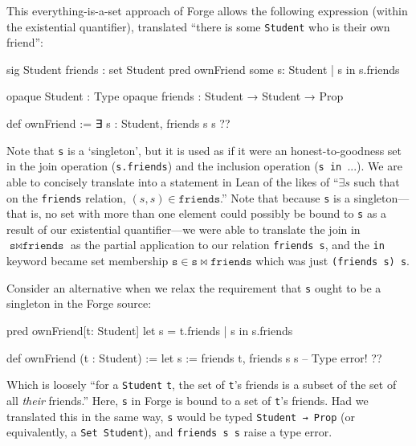 This everything-is-a-set approach of Forge allows the following expression (within the existential quantifier), translated ``there is some \texttt{Student} who is their own friend'': 

\vspace{0.5em}
\noindent\begin{minipage}{0.5\textwidth}
\begin{forge*}
sig Student {
  friends : set Student
}
pred ownFriend {
  some s: Student |
    s in s.friends
}
\end{forge*}
\end{minipage}%
\begin{minipage}{0.5\textwidth}
\begin{lean*}
opaque Student : Type
opaque friends : Student → Student → Prop

def ownFriend := 
  ∃ s : Student, 
    friends s s
?\phantom{}?
\end{lean*}
\end{minipage}
\vspace{0.5em}\newline
Note that \texttt{s} is a `singleton', but it is used as if it were an honest-to-goodness set in the join operation (\texttt{s.friends}) and the inclusion operation (\texttt{s in }...). We are able to concisely translate into a statement in Lean of the likes of ``$\exists s$ such that on the \texttt{friends} relation, $(s,s)\in \texttt{friends}$.'' Note that because \texttt{s} is a singleton---that is, no set with more than one element could possibly be bound to \texttt{s} as a result of our existential quantifier---we were able to translate the join in $\texttt{s} \bowtie \texttt{friends}$ as the partial application to our relation \texttt{friends s}, and the \texttt{in} keyword became set membership $\texttt{s}\in \texttt{s} \bowtie \texttt{friends}$ which was just \texttt{(friends s) s}. 

Consider an alternative when we relax the requirement that \texttt{s} ought to be a singleton in the Forge source: 

\vspace{0.5em}
\noindent\begin{minipage}{0.5\textwidth}
\begin{forge*}
pred ownFriend[t: Student] {
  let s = t.friends |
    s in s.friends
}
\end{forge*}
\end{minipage}%
\begin{minipage}{0.5\textwidth}
\begin{lean*}
def ownFriend (t : Student) := 
  let s := friends t, 
    friends s s -- Type error!
?\phantom{}?
\end{lean*}
\end{minipage}
\vspace{0.5em}\newline
Which is loosely ``for a \texttt{Student} \texttt{t}, the set of \texttt{t}'s friends is a subset of the set of all \emph{their} friends.'' Here, \texttt{s} in Forge is bound to a set of \texttt{t}'s friends. Had we translated this in the same way, \texttt{s} would be typed \texttt{Student → Prop} (or equivalently, a \texttt{Set Student}), and \texttt{friends s s} raise a type error. 

